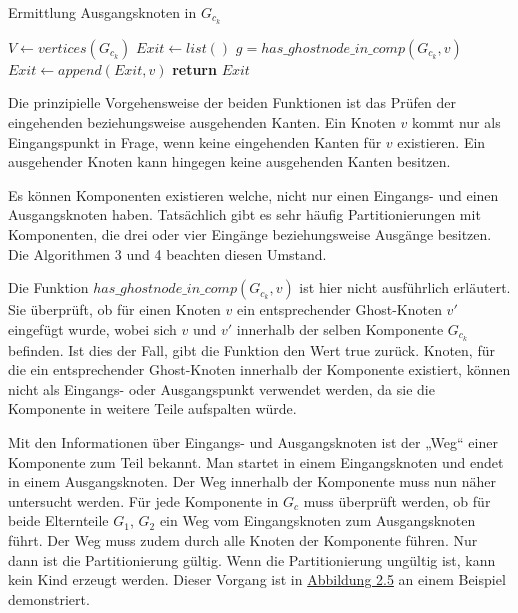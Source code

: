 \begin{algorithm}[H]
\caption{Ermittlung Ausgangsknoten in $G_{c_k}$}\label{alg:comp_out}
\begin{algorithmic}[1]
    \State $V \gets vertices(G_{c_k})$
    \State $Exit \gets list()$
      \State $g = has\_ghostnode\_in\_comp(G_{c_k}, v)$
        \State $Exit \gets append(Exit, v)$
      \EndIf
    \EndForeach
    \State \textbf{return} $Exit$
  \EndProcedure
\end{algorithmic}
\end{algorithm}
\noindent
Die prinzipielle Vorgehensweise der beiden Funktionen ist das Prüfen 
der eingehenden beziehungsweise ausgehenden Kanten. Ein Knoten $v$ kommt
nur als Eingangspunkt in Frage, wenn keine eingehenden Kanten für $v$
existieren. Ein ausgehender Knoten kann hingegen keine ausgehenden Kanten
besitzen.
\begin{bem}
  Es können Komponenten existieren welche, nicht nur einen Eingangs- und
  einen Ausgangsknoten haben. Tatsächlich gibt es sehr häufig
  Partitionierungen mit Komponenten, die drei oder vier Eingänge
  beziehungsweise Ausgänge besitzen. Die Algorithmen 3 und 4 beachten
  diesen Umstand.
\end{bem}
\begin{bem}
  Die Funktion $has\_ghostnode\_in\_comp(G_{c_k}, v)$ ist hier nicht
  ausführlich erläutert. Sie überprüft, ob für einen Knoten $v$ ein
  entsprechender Ghost-Knoten $v'$ eingefügt wurde, wobei sich $v$ und
  $v'$ innerhalb der selben Komponente $G_{c_k}$ befinden. Ist dies der Fall, gibt
  die Funktion den Wert true zurück. Knoten, für die ein entsprechender
  Ghost-Knoten innerhalb der Komponente existiert, können nicht als
  Eingangs- oder Ausgangspunkt verwendet werden, da sie die Komponente
  in weitere Teile aufspalten würde.
\end{bem}
\noindent
Mit den Informationen über Eingangs- und Ausgangsknoten ist der „Weg“ 
einer Komponente zum Teil bekannt. Man startet in einem Eingangsknoten und endet
in einem Ausgangsknoten. Der Weg innerhalb der Komponente muss nun
näher untersucht werden.
Für jede Komponente in $G_c$ muss überprüft werden,
ob für beide Elternteile $G_1$, $G_2$ ein Weg vom Eingangsknoten zum
Ausgangsknoten führt. Der Weg muss zudem durch alle Knoten der
Komponente führen. Nur dann ist die Partitionierung gültig. Wenn die
Partitionierung ungültig ist, kann kein Kind erzeugt werden.
Dieser Vorgang ist in \hyperref[fig:entry_exit]{Abbildung 2.5} an einem Beispiel demonstriert.

